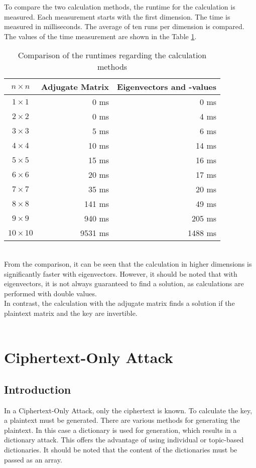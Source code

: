 \documentclass[conference]{IEEEtran}
\begin{document}
To compare the two calculation methods, the runtime for the calculation is measured. Each measurement starts with the first dimension. The time is measured in milliseconds. The average of ten runs per dimension is compared. The values of the time measurement are shown in the Table \ref{tab:runtime_table}.
\\
\begin{table}[h!]
\centering
\caption{Comparison of the runtimes regarding the calculation methods}
\label{tab:runtime_table}
\begin{tabular}{|c|r|r|}
\hline
 \textbf{\( n \times n \)}& \textbf{Adjugate Matrix} & \textbf{Eigenvectors and -values} \\
\hline
 \( 1 \times 1 \)& 0 ms & 0 ms\\
\( 2 \times 2 \)& 0 ms & 4 ms\\
\( 3 \times 3 \)& 5 ms & 6 ms\\
\( 4 \times 4 \)& 10 ms & 14 ms\\
\( 5 \times 5 \)& 15 ms & 16 ms\\
\( 6 \times 6 \)& 20 ms & 17 ms\\
\( 7 \times 7 \)& 35 ms & 20 ms\\
\( 8 \times 8 \)& 141 ms & 49 ms\\
\( 9 \times 9\)& 940 ms & 205 ms\\
\( 10 \times 10 \)& 9531 ms & 1488 ms\\
\hline
\end{tabular}
\end{table}
\\
From the comparison, it can be seen that the calculation in higher dimensions is significantly faster with eigenvectors. However, it should be noted that with eigenvectors, it is not always guaranteed to find a solution, as calculations are performed with double values.
\\
In contrast, the calculation with the adjugate matrix finds a solution if the plaintext matrix and the key are invertible.
\\\\

\section{Ciphertext-Only Attack}
\subsection{Introduction}
In a Ciphertext-Only Attack, only the ciphertext is known. To calculate the key, a plaintext must be generated. There are various methods for generating the plaintext. In this case a dictionary is used for generation, which results in a dictionary attack. This offers the advantage of using individual or topic-based dictionaries. It should be noted that the content of the dictionaries must be passed as an array.
\end{document}

